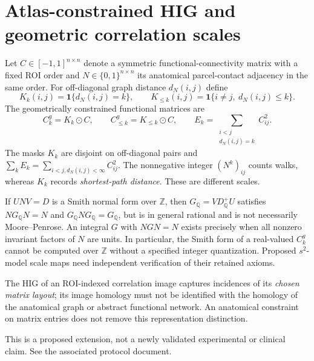 \section{Atlas-constrained HIG and geometric correlation scales}
Let $C\in[-1,1]^{n\times n}$ denote a symmetric functional-connectivity
matrix with a fixed ROI order and $N\in\{0,1\}^{n\times n}$ its
anatomical parcel-contact adjacency in the same order.
For off-diagonal graph distance $d_N(i,j)$ define
\[
 K_k(i,j)=\mathbf{1}\{d_N(i,j)=k\},\qquad
 K_{\le k}(i,j)=\mathbf{1}\{i\ne j,\ d_N(i,j)\le k\}.
\]
The geometrically constrained functional matrices are
\[
 C_k^g=K_k\odot C,\qquad
 C_{\le k}^g=K_{\le k}\odot C,\qquad
 E_k=\sum_{\substack{i<j\\d_N(i,j)=k}} C_{ij}^2.
\]
The masks $K_k$ are disjoint on off-diagonal pairs and
$\sum_k E_k=\sum_{i<j,d_N(i,j)<\infty}C_{ij}^2$.
The nonnegative integer $(N^k)_{ij}$ counts walks, whereas
$K_k$ records \emph{shortest-path distance}. These are
different scales.

If $UNV=D$ is a Smith normal form over $\mathbb Z$, then
$G_{\mathbb Q}=V D_{\mathbb Q}^+ U$ satisfies
$NG_{\mathbb Q}N=N$ and $G_{\mathbb Q}NG_{\mathbb Q}=G_{\mathbb Q}$,
but is in general rational and is not necessarily Moore--Penrose.
An integral $G$ with $NGN=N$ exists precisely when all
nonzero invariant factors of $N$ are units. In particular, the
Smith form of a real-valued $C_k^g$ cannot be computed over
$\mathbb Z$ without a specified integer quantization.
Proposed $s^2$-model scale maps need independent verification of
their retained axioms.

The HIG of an ROI-indexed correlation image captures incidences
of its \emph{chosen matrix layout}; its image homology must not be
identified with the homology of the anatomical graph or abstract
functional network. An anatomical constraint on matrix entries
does not remove this representation distinction.

This is a proposed extension, not a newly validated experimental
or clinical claim. See the associated protocol document.
